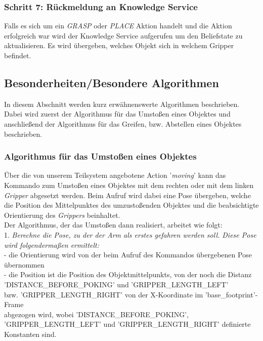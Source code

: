 \documentclass{suturo}
\begin{document}
\subsubsection*{Schritt 7: Rückmeldung an Knowledge Service}
Falls es sich um ein \textit{GRASP} oder \textit{PLACE} Aktion handelt und die Aktion erfolgreich war wird der Knowledge Service aufgerufen um den Beliefstate zu aktualisieren. Es wird übergeben, welches Objekt sich in welchem Gripper befindet.


\subsection{Besonderheiten/Besondere Algorithmen}
In diesem Abschnitt werden kurz erwähnenswerte Algorithmen beschrieben.
Dabei wird zuerst der Algorithmus für das Umstoßen eines Objektes und anschließend der Algorithmus für das Greifen, bzw. Abstellen eines Objektes beschrieben.\\

\subsubsection{Algorithmus für das Umstoßen eines Objektes}
Über die von unserem Teilsystem angebotene Action '\textit{moving}' kann das Kommando zum Umstoßen eines Objektes mit dem rechten oder mit dem linken \textit{Gripper} abgesetzt werden. Beim Aufruf wird dabei eine Pose übergeben, welche die Position des Mittelpunktes des umzustoßenden Objektes und die beabsichtigte Orientierung des \textit{Grippers} beinhaltet. \\Der Algorithmus, der das Umstoßen dann realisiert, arbeitet wie folgt:\\

1. \textit{Berechne die Pose, zu der der Arm als erstes gefahren werden soll. Diese Pose wird folgendermaßen ermittelt:}\\
\tab - die Orientierung wird von der beim Aufruf des Kommandos übergebenen Pose übernommen\\
\tab - die Position ist die Position des Objektmittelpunkts, von der noch die Distanz\\ \tab   'DISTANCE\_BEFORE\_POKING' und 'GRIPPER\_LENGTH\_LEFT'\\ \tab bzw. 'GRIPPER\_LENGTH\_RIGHT' von der X-Koordinate im 'base\_footprint'-Frame \\ \tab abgezogen wird, wobei 'DISTANCE\_BEFORE\_POKING', 'GRIPPER\_LENGTH\_LEFT' \tab und 'GRIPPER\_LENGTH\_RIGHT' definierte Konstanten sind.\\
\end{document}
